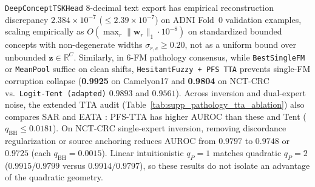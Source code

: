 \documentclass[10pt,twocolumn]{article}
\begin{document}
\texttt{DeepConceptTSKHead} 8-decimal text export has empirical reconstruction discrepancy
$2.384 \times 10^{-7}$ ($\le2.39 \times 10^{-7}$) on ADNI Fold~0 validation examples,
scaling empirically as $O(\max_r\|\bm{w}_r\|_1\cdot10^{-8})$ on standardized bounded concepts
with non-degenerate widths $\sigma_{r,c}\ge0.20$, not as a uniform bound over unbounded
$\bm{z}\in\mathbb{R}^C$. Similarly, in 6-FM pathology consensus, while
\texttt{BestSingleFM} or \texttt{MeanPool} suffice on clean shifts, \texttt{HesitantFuzzy + PFS
TTA} prevents single-FM corruption collapse (\textbf{0.9925} on Camelyon17 and \textbf{0.9804}
on NCT-CRC vs.\ \texttt{Logit-Tent (adapted)} $0.9893$ and $0.9561$).
Across inversion and dual-expert noise, the extended TTA audit
(Table~\ref{tab:supp_pathology_tta_ablation}) also compares SAR and EATA
\cite{niu2022eata,niu2023sar}: PFS-TTA has higher AUROC than these and Tent
($q_{\mathrm{BH}}\le0.0181$). On NCT-CRC single-expert inversion, removing discordance
regularization or source anchoring reduces AUROC from $0.9797$ to $0.9748$ or $0.9725$
(each $q_{\mathrm{BH}}=0.0015$). Linear intuitionistic $q_P=1$ matches quadratic $q_P=2$
($0.9915/0.9799$ versus $0.9914/0.9797$), so these results do not isolate an advantage of
the quadratic geometry.
\end{document}
